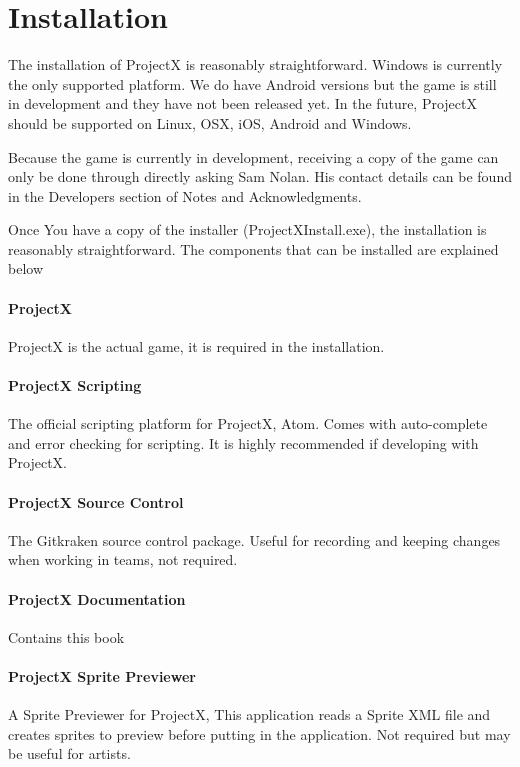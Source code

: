 \documentclass{book}
\begin{document}
	\section{Installation}
	The installation of ProjectX is reasonably straightforward. Windows is currently the only supported platform. We do have Android versions but the game is still in development and they have not been released yet. In the future, ProjectX should be supported on Linux, OSX, iOS, Android and Windows.
	
	Because the game is currently in development, receiving a copy of the game can only be done through directly asking Sam Nolan. His contact details can be found in the Developers section of Notes and Acknowledgments.  
	
	Once You have a copy of the installer (ProjectXInstall.exe), the installation is reasonably straightforward. The components that can be installed are explained below
	
	\paragraph{ProjectX}
	ProjectX is the actual game, it is required in the installation.
	
	\paragraph{ProjectX Scripting}
	The official scripting platform for ProjectX, Atom. Comes with auto-complete and error checking for scripting. It is highly recommended if developing with ProjectX.
	
	\paragraph{ProjectX Source Control}
	The Gitkraken source control package. Useful for recording and keeping changes when working in teams, not required.
	
	\paragraph{ProjectX Documentation}
	Contains this book
	
	\paragraph{ProjectX Sprite Previewer}
	A Sprite Previewer for ProjectX, This application reads a Sprite XML file  and creates sprites to preview before putting in the application. Not required but may be useful for artists.
	
\end{document}
